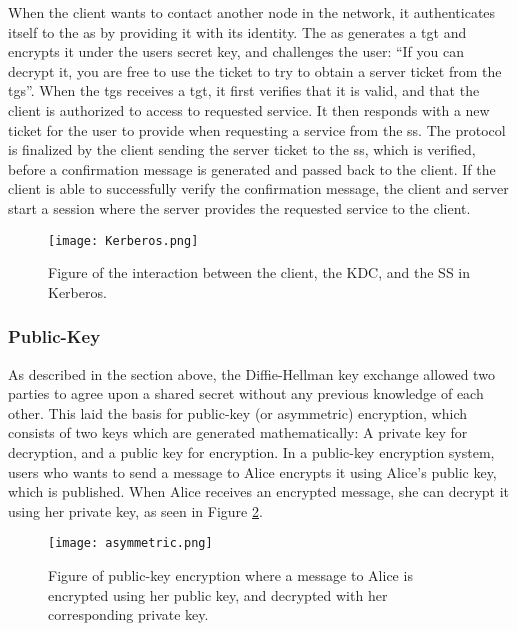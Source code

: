 When the client wants to contact another node in the network, it authenticates itself to the \gls{as} by providing it with its identity. The \gls{as} generates a \gls{tgt} and encrypts it under the users secret key, and challenges the user: ``If you can decrypt it, you are free to use the ticket to try to obtain a server ticket from the \gls{tgs}''. When the \gls{tgs} receives a \gls{tgt}, it first verifies that it is valid, and that the client is authorized to access to requested service. It then responds with a new ticket for the user to provide when requesting a service from the \gls{ss}. The protocol is finalized by the client sending the server ticket to the \gls{ss}, which is verified, before a confirmation message is generated and passed back to the client. If the client is able to successfully verify the confirmation message, the client and server start a session where the server provides the requested service to the client.


\begin{figure}[h]
	\centering
	\texttt{[image: Kerberos.png]}
	\caption{Figure of the interaction between the client, the KDC, and the SS in Kerberos.}
	\label{fig:kerberos}
\end{figure}

\newpage

\subsubsection{Public-Key}

As described in the section above, the Diffie-Hellman key exchange allowed two parties to agree upon a shared secret without any previous knowledge of each other. This laid the basis for public-key (or asymmetric) encryption, which consists of two keys which are generated mathematically: A private key for decryption, and a public key for encryption. In a public-key encryption system, users who wants to send a message to Alice encrypts it using Alice's public key, which is published. When Alice receives an encrypted message, she can decrypt it using her private key, as seen in Figure \ref{fig:asymmetric}.


\begin{figure}[h]
	\centering
	\texttt{[image: asymmetric.png]}
	\caption{Figure of public-key encryption where a message to Alice is encrypted using her public key, and decrypted with her corresponding private key.}
	\label{fig:asymmetric}
\end{figure}

